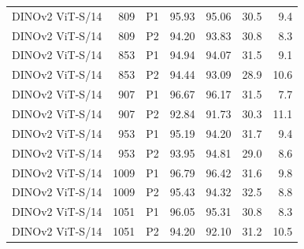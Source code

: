 {\begin{longtable}{lrlrrrr}
DINOv2 ViT-S/14 & 809 & P1 & 95.93 & 95.06 & 30.5 & 9.4 \\
DINOv2 ViT-S/14 & 809 & P2 & 94.20 & 93.83 & 30.8 & 8.3 \\
DINOv2 ViT-S/14 & 853 & P1 & 94.94 & 94.07 & 31.5 & 9.1 \\
DINOv2 ViT-S/14 & 853 & P2 & 94.44 & 93.09 & 28.9 & 10.6 \\
DINOv2 ViT-S/14 & 907 & P1 & 96.67 & 96.17 & 31.5 & 7.7 \\
DINOv2 ViT-S/14 & 907 & P2 & 92.84 & 91.73 & 30.3 & 11.1 \\
DINOv2 ViT-S/14 & 953 & P1 & 95.19 & 94.20 & 31.7 & 9.4 \\
DINOv2 ViT-S/14 & 953 & P2 & 93.95 & 94.81 & 29.0 & 8.6 \\
DINOv2 ViT-S/14 & 1009 & P1 & 96.79 & 96.42 & 31.6 & 9.8 \\
DINOv2 ViT-S/14 & 1009 & P2 & 95.43 & 94.32 & 32.5 & 8.8 \\
DINOv2 ViT-S/14 & 1051 & P1 & 96.05 & 95.31 & 30.8 & 8.3 \\
DINOv2 ViT-S/14 & 1051 & P2 & 94.20 & 92.10 & 31.2 & 10.5 \\
\end{longtable}
}
